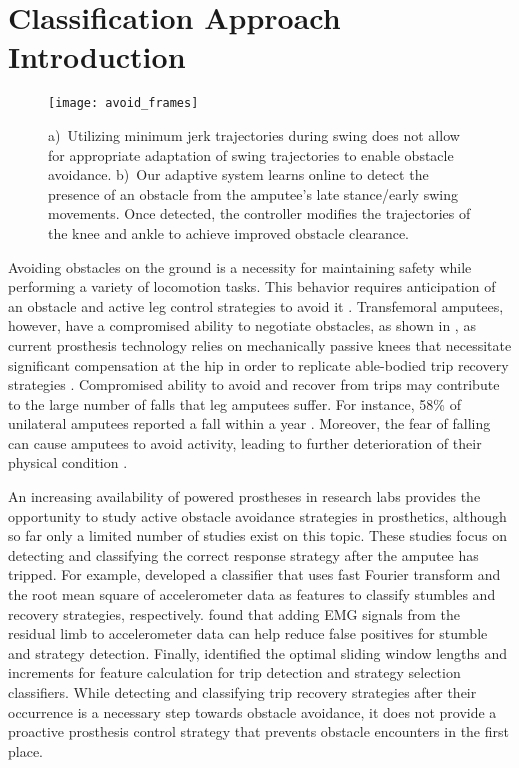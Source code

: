 \section{Classification Approach Introduction}\label{sec:swing_control_class}

\begin{figure*}[t]
\centering
\texttt{[image: avoid\_frames]}
\caption[Comparison of minimum jerk and adaptive swing contrls when stepping
over obstacle]{a)~Utilizing minimum jerk trajectories during swing does not
allow for appropriate adaptation of swing trajectories to enable obstacle
avoidance. b)~Our adaptive system learns online to detect the presence of an
obstacle from the amputee's late stance/early swing movements. Once detected,
the controller modifies the trajectories of the knee and ankle to achieve
improved obstacle clearance.}\label{fig:avoid_frames}
\end{figure*}

Avoiding obstacles on the ground is a necessity for maintaining safety while
performing a variety of locomotion tasks. This behavior requires anticipation of
an obstacle and active leg control strategies to avoid it \citep{patla1995role}.
Transfemoral amputees, however, have a compromised ability to negotiate
obstacles, as shown in , as current prosthesis technology
relies on mechanically passive knees that necessitate significant compensation
at the hip in order to replicate able-bodied trip recovery strategies
\citep{shirota2015transfemoral}. Compromised ability to avoid and recover from
trips may contribute to the large number of falls that leg amputees suffer. For
instance, 58\% of unilateral amputees reported a fall within a year
\citep{kulkarni1996falls}. Moreover, the fear of falling can cause amputees to
avoid activity, leading to further deterioration of their physical condition
\citep{miller2001prevalence}.

An increasing availability of powered prostheses in research labs provides the
opportunity to study active obstacle avoidance strategies in prosthetics,
although so far only a limited number of studies exist on this topic. These
studies focus on detecting and classifying the correct response strategy after
the amputee has tripped. For example, \citet{lawson2010stumble} developed a
classifier that uses fast Fourier transform and the root mean square of
accelerometer data as features to classify stumbles and recovery strategies,
respectively. \citet{zhang2011towards} found that adding EMG signals from the
residual limb to accelerometer data can help reduce false positives for stumble
and strategy detection. Finally, \citet{shirota2014recovery} identified the
optimal sliding window lengths and increments for feature calculation for trip
detection and strategy selection classifiers. While detecting and classifying
trip recovery strategies after their occurrence is a necessary step towards
obstacle avoidance, it does not provide a proactive prosthesis control strategy
that prevents obstacle encounters in the first place.

